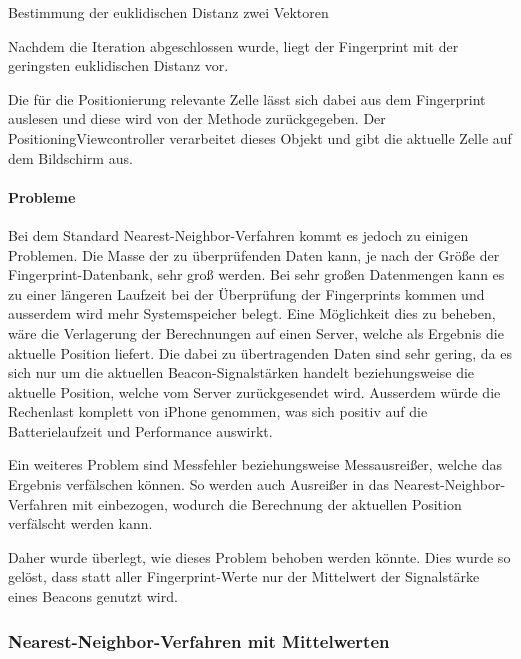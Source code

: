 \begin{listing}[htb!]
    \caption{Bestimmung der euklidischen Distanz zwei Vektoren}
	\label{lst:euclidean_distance_objc}
\end{listing}


Nachdem die Iteration abgeschlossen wurde, liegt der Fingerprint mit der geringsten euklidischen Distanz vor. 

Die für die Positionierung relevante Zelle lässt sich dabei aus dem Fingerprint auslesen und diese wird von der Methode zurückgegeben.
Der PositioningViewcontroller verarbeitet dieses Objekt und gibt die aktuelle Zelle auf dem Bildschirm aus.

\paragraph{Probleme}
\label{sec:implementation:fingerprinting:positioning:naiv:problems}
Bei dem Standard Nearest-Neighbor-Verfahren kommt es jedoch zu einigen Problemen. 
Die Masse der zu überprüfenden Daten kann, je nach der Größe der Fingerprint-Datenbank, sehr groß werden. Bei sehr großen Datenmengen kann es zu einer längeren Laufzeit bei der Überprüfung der Fingerprints kommen und ausserdem wird mehr Systemspeicher belegt. 
Eine Möglichkeit dies zu beheben, wäre die Verlagerung der Berechnungen auf einen Server, welche als Ergebnis die aktuelle Position liefert. Die dabei zu übertragenden Daten sind sehr gering, da es sich nur um die aktuellen Beacon-Signalstärken handelt beziehungsweise die aktuelle Position, welche vom Server zurückgesendet wird. 
Ausserdem würde die Rechenlast komplett von iPhone genommen, was sich positiv auf die Batterielaufzeit und Performance auswirkt.

Ein weiteres Problem sind Messfehler beziehungsweise Messausreißer, welche das Ergebnis verfälschen können. So werden auch Ausreißer in das Nearest-Neighbor-Verfahren mit einbezogen, wodurch die Berechnung der aktuellen Position verfälscht werden kann.

Daher wurde überlegt, wie dieses Problem behoben werden könnte. Dies wurde so gelöst, dass statt aller Fingerprint-Werte nur der Mittelwert der Signalstärke eines Beacons genutzt wird.


\subsubsection{Nearest-Neighbor-Verfahren mit Mittelwerten}
\label{sec:implementation:fingerprinting:positioning:avg}

